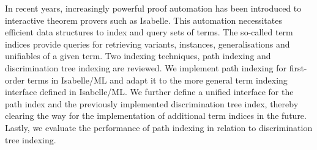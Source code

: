 \thispagestyle{empty}
\vspace*{20mm}

\begin{center}
\textbf{{\abstractname}}
\end{center}

\vspace{10mm}
In recent years, increasingly powerful proof automation has been introduced to interactive theorem provers such as Isabelle.
This automation necessitates efficient data structures to index and query sets of terms.
The so-called term indices provide queries for retrieving variants, instances, generalisations and unifiables of a given term.
Two indexing techniques, path indexing and discrimination tree indexing are reviewed.
We implement path indexing for first-order terms in Isabelle/ML and adapt it to the more general term indexing interface defined in Isabelle/ML.
We further define a unified interface for the path index and the previously implemented discrimination tree index, thereby clearing the way for the implementation of additional term indices in the future.
Lastly, we evaluate the performance of path indexing in relation to discrimination tree indexing.

\cleardoublepage{}
